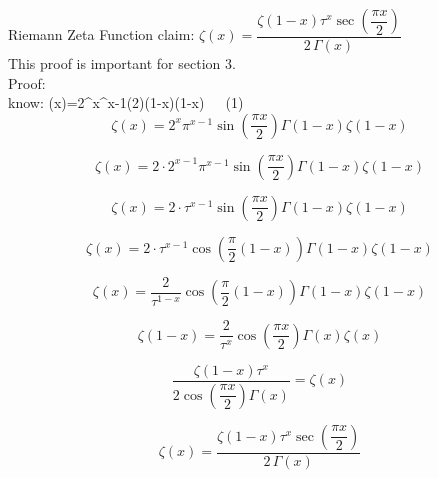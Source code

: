 \documentclass[12pt]{article}
\begin{document}
\pagebreak\begin{section}{Riemann Zeta Function}
	claim: $\zeta(x)=\dfrac{\zeta(1-x)\tau^x\sec\left(\dfrac{\pi x}2\right)}{2\,\Gamma(x)}$\\
	This proof is important for section 3.\\
	Proof:\\
	know: \zeta(x)=2^x\pi^{x-1}\sin\left(2\right)\Gamma(1-x)\zeta(1-x)~~~(1)\\

	\begin{equation}
		\zeta(x)=2^x\pi^{x-1}\sin\left(\dfrac{\pi x}2\right)\Gamma\left(1-x\right)\zeta\left(1-x\right)
	\end{equation}

	\begin{equation}
		\zeta(x)=2\cdot2^{x-1}\pi^{x-1}\sin\left(\dfrac{\pi x}2\right)\Gamma(1-x)\zeta(1-x)
	\end{equation}

	\begin{equation}
		\zeta(x)=2\cdot\tau^{x-1}\sin\left(\dfrac{\pi x}2\right)\Gamma(1-x)\zeta(1-x)
	\end{equation}

	\begin{equation}
		\zeta(x)=2\cdot\tau^{x-1}\cos\left(\dfrac\pi2(1-x)\right)\Gamma(1-x)\zeta(1-x)
	\end{equation}

	\begin{equation}
		\zeta(x)=\dfrac2{\tau^{1-x}}\cos\left(\dfrac\pi2(1-x)\right)\Gamma(1-x)\zeta(1-x)
	\end{equation}

	\begin{equation}
		\zeta(1-x)=\dfrac2{\tau^x}\cos\left(\dfrac{\pi x}2\right)\Gamma(x)\zeta(x)
	\end{equation}

	\begin{equation}
		\dfrac{\zeta(1-x)\tau^x}{2\cos\left(\dfrac{\pi x}2\right)\Gamma(x)}=\zeta(x)
	\end{equation}

	\begin{equation}
		\zeta(x)=\dfrac{\zeta(1-x)\tau^x\sec\left(\dfrac{\pi x}2\right)}{2\,\Gamma(x)}
	\end{equation}

	\noindent\blacksquare
\end{section}
\end{document}
